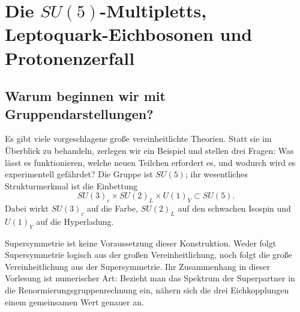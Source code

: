\chapter{Die \texorpdfstring{\(SU(5)\)}{5}-Multipletts, Leptoquark-Eichbosonen und Protonenzerfall}


\section{Warum beginnen wir mit Gruppendarstellungen?}

Es gibt viele vorgeschlagene große vereinheitlichte Theorien. Statt sie im Überblick zu behandeln, zerlegen wir ein Beispiel und stellen drei Fragen: Was lässt es funktionieren, welche neuen Teilchen erfordert es, und wodurch wird es experimentell gefährdet? Die Gruppe ist \(SU(5)\); ihr wesentliches Strukturmerkmal ist die Einbettung
\begin{equation}
SU(3)_c\times SU(2)_L\times U(1)_Y
\subset SU(5).
\label{eq:l10-sm-embedding}
\end{equation}
Dabei wirkt \(SU(3)_c\) auf die Farbe, \(SU(2)_L\) auf den schwachen Isospin und \(U(1)_Y\) auf die Hyperladung.

Supersymmetrie ist keine Voraussetzung dieser Konstruktion. Weder folgt Supersymmetrie logisch aus der großen Vereinheitlichung, noch folgt die große Vereinheitlichung aus der Supersymmetrie. Ihr Zusammenhang in dieser Vorlesung ist numerischer Art: Bezieht man das Spektrum der Superpartner in die Renormierungsgruppenrechnung ein, nähern sich die drei Eichkopplungen einem gemeinsamen Wert genauer an.

